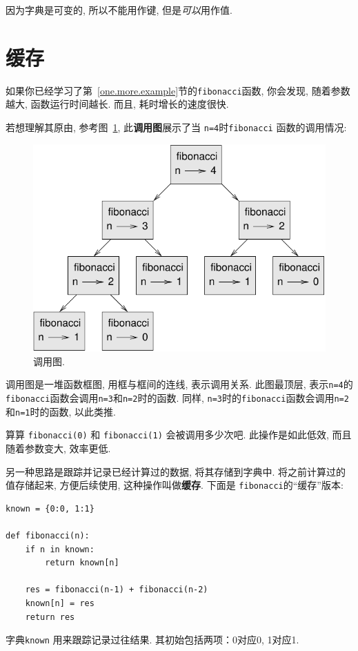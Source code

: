 \documentclass[10pt]{book}
\begin{document}
因为字典是可变的, 所以不能用作键, 
但是{\em 可以}用作值. 

\section{缓存}
\label{memoize}

如果你已经学习了第~\ref{one.more.example}节的{\tt fibonacci}函数, 
你会发现, 随着参数越大, 函数运行时间越长. 而且, 耗时增长的速度很快. 

若想理解其原由, 参考图~\ref{fig.fibonacci}, 此{\bf 调用图}展示了当
{\tt n=4}时{\tt fibonacci} 函数的调用情况:
\begin{figure}
\centerline
{\includegraphics[scale=0.7]{figs/fibonacci.pdf}}
\caption{调用图.}
\label{fig.fibonacci}
\end{figure}
调用图是一堆函数框图, 用框与框间的连线, 表示调用关系. 
此图最顶层, 表示{\tt n=4}的{\tt fibonacci}函数会调用{\tt n=3}和{\tt n=2}时的函数. 
同样, {\tt n=3}时的{\tt fibonacci}函数会调用{\tt n=2}和{\tt n=1}时的函数, 
以此类推. 

算算 {\tt fibonacci(0)} 和 {\tt fibonacci(1)} 会被调用多少次吧. 
此操作是如此低效, 而且随着参数变大, 效率更低. 

另一种思路是跟踪并记录已经计算过的数据, 将其存储到字典中. 
将之前计算过的值存储起来, 方便后续使用, 这种操作叫做{\bf 缓存}.
下面是 {\tt fibonacci}的``缓存''版本:

\begin{verbatim}
known = {0:0, 1:1}

def fibonacci(n):
    if n in known:
        return known[n]

    res = fibonacci(n-1) + fibonacci(n-2)
    known[n] = res
    return res
\end{verbatim}
%
字典{\tt known} 用来跟踪记录过往结果. 
其初始包括两项：0对应0, 1对应1.
\end{document}
